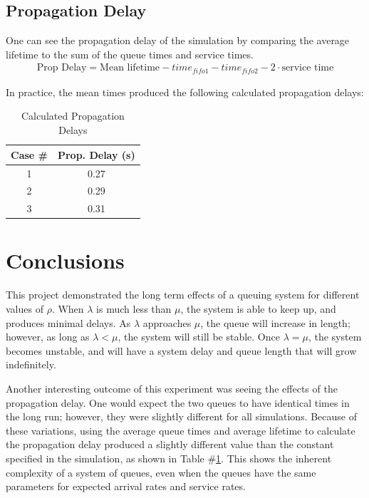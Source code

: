 \documentclass{article}
\begin{document}
\subsection{Propagation Delay}
One can see the propagation delay of the simulation by comparing the average lifetime to the sum of the queue times and service times.
\begin{align*}
\text{Prop Delay} = \text{Mean lifetime} - time_{fifo1} - time_{fifo2} - 2 \cdot \text{service time}
\end{align*}

In practice, the mean times produced the following calculated propagation delays:

\begin{table}[h!]
\centering
\begin{tabular}{|c|c|} \hline
\textbf{Case \#} & \textbf{Prop. Delay (s)} \\ \hline
1 & 0.27 \\ \hline
2 & 0.29 \\ \hline
3 & 0.31 \\ \hline
\end{tabular}
\caption{Calculated Propagation Delays}
\label{tab:calcPropDelay}
\end{table}


\section{Conclusions}
This project demonstrated the long term effects of a queuing system for different values of $\rho$.  
When $\lambda$ is much less than $\mu$, the system is able to keep up, and produces minimal delays.  
As $\lambda$ approaches $\mu$, the queue will increase in length; however, as long as $\lambda < \mu$, the system will still be stable.
Once $\lambda = \mu$, the system becomes unstable, and will have a system delay and queue length that will grow indefinitely.

Another interesting outcome of this experiment was seeing the effects of the propagation delay.  
One would expect the two queues to have identical times in the long run; however, they were slightly different for all simulations.
Because of these variations, using the average queue times and average lifetime to calculate the propagation delay produced a slightly different value than the constant specified in the simulation, as shown in Table \#\ref{tab:calcPropDelay}.
This shows the inherent complexity of a system of queues, even when the queues have the same parameters for expected arrival rates and service rates.
\end{document}
